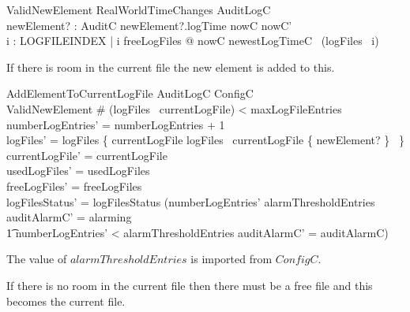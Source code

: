 \begin{schema}{ValidNewElement}
        RealWorldTimeChanges
\also
        AuditLogC
\\      newElement? : AuditC
\where
        newElement?.logTime \in nowC \upto nowC' 
\\      \forall i : LOGFILEINDEX | i \notin freeLogFiles @
        nowC \geq newestLogTimeC~ (logFiles~ i) 
\end{schema}

If there is room in the current file the new element is added to this.

\begin{schema}{AddElementToCurrentLogFile}
        \Delta AuditLogC
\also
        ConfigC
\\      ValidNewElement
\where
      \# (logFiles~ currentLogFile) < maxLogFileEntries
\also
        numberLogEntries' = numberLogEntries + 1 
\\      logFiles' = logFiles \oplus \{ currentLogFile \mapsto
logFiles~ currentLogFile \cup \{ newElement? \}~ \}
\\      currentLogFile' = currentLogFile 
\\      usedLogFiles' = usedLogFiles
\\      freeLogFiles' = freeLogFiles 
\\      logFilesStatus' = logFilesStatus
\also
      (numberLogEntries' \geq alarmThresholdEntries \land auditAlarmC' = alarming
\\ \t1   \lor numberLogEntries' < alarmThresholdEntries \land
auditAlarmC' = auditAlarmC)
\end{schema}
\begin{Zcomment}
\item
The value of $alarmThresholdEntries$ is imported from $ConfigC$. 
\end{Zcomment}

If there is no room in the current file then there must be a free file
and this becomes the current file.

